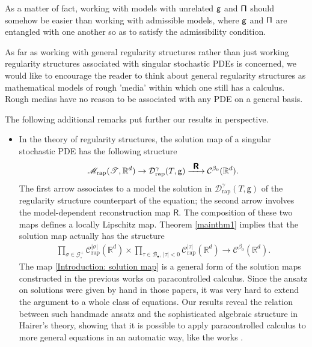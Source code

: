 \documentclass[10pt]{amsart}
\newcommand{\To}[1]{\mathchoice{\xrightarrow{\textstyle\kern4pt#1\kern3pt}}{\stackrel{#1}{\longrightarrow}}{}{}}
\newcommand{\sbullet}{{\scriptscriptstyle\bullet}}
\theoremstyle{plain}
\theoremstyle{definition}
\newcommand{\rap}{\mathrm{rap}}
\newcommand{\reR}{\boldsymbol{\mathsf{R}}}
\newcommand{\sfg}{\mathsf{g}}
\newcommand{\scrM}{\mathscr{M}}
\newcommand{\scrT}{\mathscr{T}}
\newcommand{\bbR}{\mathbb{R}}
\newcommand{\mcB}{\mathcal{B}}
\newcommand{\mcC}{\mathcal{C}}
\newcommand{\mcD}{\mathcal{D}}
\newcommand{\mcG}{\mathcal{G}}
\begin{document}
As a matter of fact, working with models with unrelated $\sf g$ and $\sf \Pi$ should somehow be easier than working with admissible models, where $\sf g$ and $\sf \Pi$ are entangled with one another so as to satisfy the admissibility condition.

As far as working with general regularity structures rather than just working regularity structures associated with singular stochastic PDEs is concerned, we would like to encourage the reader to think about general regularity structures as mathematical models of rough 'media' within which one still has a calculus. Rough medias have no reason to be associated with any PDE on a general basis.

The following additional remarks put further our results in perspective.
\begin{itemize}
	\item In the theory of regularity structures, the solution map of a singular stochastic PDE has the following structure
\[
\scrM_\rap(\scrT,\bbR^d) \to \mcD_\rap^\gamma(T,\sfg) \To{\reR} \mcC^{\beta_0}(\bbR^d).
\]
The first arrow associates to a model the solution in $\mcD_\rap^\gamma(T,\sfg)$ of the regularity structure counterpart of the equation; the second arrow involves the model-dependent reconstruction map $\reR$. The composition of these two maps defines a locally Lipschitz map. Theorem \ref{mainthm1} implies that the solution map actually has the structure
\begin{align}\label{Introduction: solution map}
\prod_{\sigma\in\mcG_\circ^+} \mcC_\rap^{|\sigma|}(\bbR^d) \times \prod_{\tau\in\mcB_\sbullet,\,|\tau|<0} \mcC_\rap^{|\tau|}(\bbR^d)
\to \mcC^{\beta_0}(\bbR^d).
\end{align}
The map \eqref{Introduction: solution map} is a general form of the solution maps constructed in the previous works \cite{GIP, BB16} on paracontrolled calculus. Since the ansatz on solutions were given by hand in those papers, it was very hard to extend the argument to a whole class of equations. Our results reveal the relation between such handmade ansatz and the sophisticated algebraic structure in Hairer's theory, showing that it is possible to apply paracontrolled calculus to more general equations in an automatic way, like the works \cite{Hai, BHZ, CH16, BCCH18}.
	

\end{itemize}
\end{document}
